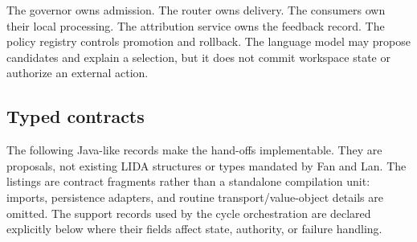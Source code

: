 The governor owns admission. The router owns delivery. The consumers own their local processing. The attribution service owns the feedback record. The policy registry controls promotion and rollback. The language model may propose candidates and explain a selection, but it does not commit workspace state or authorize an external action.


\subsection{Typed contracts}

The following Java-like records make the hand-offs implementable. They are proposals, not existing LIDA structures or types mandated by Fan and Lan. The listings are contract fragments rather than a standalone compilation unit: imports, persistence adapters, and routine transport/value-object details are omitted. The support records used by the cycle orchestration are declared explicitly below where their fields affect state, authority, or failure handling.

